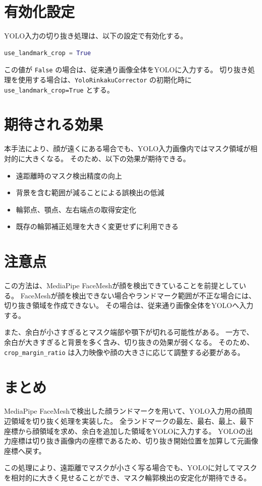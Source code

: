 \documentclass[uplatex,dvipdfmx]{jsarticle}
\begin{document}
\section{有効化設定}

YOLO入力の切り抜き処理は、以下の設定で有効化する。

\begin{lstlisting}[language=Python]
use_landmark_crop = True
\end{lstlisting}

この値が \verb|False| の場合は、従来通り画像全体をYOLOに入力する。
切り抜き処理を使用する場合は、\verb|YoloRinkakuCorrector| の初期化時に \verb|use_landmark_crop=True| とする。

\section{期待される効果}

本手法により、顔が遠くにある場合でも、YOLO入力画像内ではマスク領域が相対的に大きくなる。
そのため、以下の効果が期待できる。

\begin{itemize}
  \item 遠距離時のマスク検出精度の向上
  \item 背景を含む範囲が減ることによる誤検出の低減
  \item 輪郭点、顎点、左右端点の取得安定化
  \item 既存の輪郭補正処理を大きく変更せずに利用できる
\end{itemize}

\section{注意点}

この方法は、MediaPipe FaceMeshが顔を検出できていることを前提としている。
FaceMeshが顔を検出できない場合やランドマーク範囲が不正な場合には、切り抜き領域を作成できない。
その場合は、従来通り画像全体をYOLOへ入力する。

また、余白が小さすぎるとマスク端部や顎下が切れる可能性がある。
一方で、余白が大きすぎると背景を多く含み、切り抜きの効果が弱くなる。
そのため、\verb|crop_margin_ratio| は入力映像や顔の大きさに応じて調整する必要がある。

\section{まとめ}

MediaPipe FaceMeshで検出した顔ランドマークを用いて、YOLO入力用の顔周辺領域を切り抜く処理を実装した。
全ランドマークの最左、最右、最上、最下座標から顔領域を求め、余白を追加した領域をYOLOに入力する。
YOLOの出力座標は切り抜き画像内の座標であるため、切り抜き開始位置を加算して元画像座標へ戻す。

この処理により、遠距離でマスクが小さく写る場合でも、YOLOに対してマスクを相対的に大きく見せることができ、マスク輪郭検出の安定化が期待できる。
\end{document}
